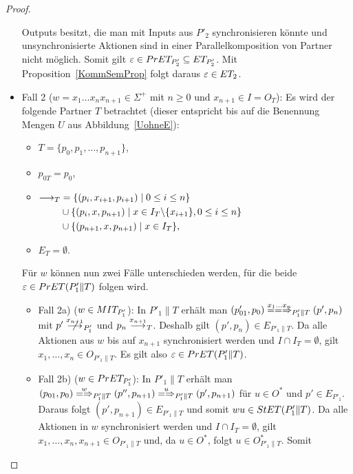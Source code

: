 \begin{proof}
\begin{itemize}
      Outputs besitzt, die man mit Inputs aus $P'_2$ synchronisieren könnte und
      unsynchronisierte Aktionen sind in einer Parallelkomposition von Partner
      nicht möglich. Somit gilt $\varepsilon\in PrET _{P'_2}\subseteq ET
      _{P'_2}$. Mit Proposition~\ref{KommSemProp} folgt daraus $\varepsilon\in
      ET _2$.
    \item Fall 2 ($w=x_1\dots x_n x_{n+1}\in\Sigma ^+$ mit $n\geq 0$ und
      $x_{n+1}\in I=O_T$): Es wird der folgende Partner $T$ betrachtet (dieser
      entspricht bis auf die Benennung Mengen $U$ aus Abbildung~\ref{UohneE}):
      \begin{itemize}
        \item $T=\{p_0,p_1,\dots ,p_{n+1}\}$,
        \item $p_{0T}=p_0$,
        \item $\begin{aligned}[t]
            \must _T&=\{(p_i,x_{i+1},p_{i+1})\mid  0\leq i\leq n\}\\
            &\cup\{(p_i,x,p_{n+1})\mid  x\in I_T\backslash\{x_{i+1}\}, 0\leq
            i\leq n\}\\
            &\cup\{(p_{n+1},x,p_{n+1})\mid  x\in I_T\},
        \end{aligned}$
        \item $E_T=\emptyset$.
      \end{itemize}
      Für $w$ können nun zwei Fälle unterschieden werden, für die beide
      $\varepsilon\in PrET (P'_1\|T)$ folgen wird.
      \begin{itemize}
        \item Fall 2a) ($w\in MIT _{P'_1}$): In $P'_1\|T$ erhält man
          $(p'_{01},p_0) \lweakmay[x_1\dots x_n]_{P'_1\|T} (p',p_n)$ mit $p'
          \nmust[x_{n+1}]_{P'_1}$ und $p_n\must[x_{n+1}]_T$. Deshalb gilt
          $(p',p_n)\in E_{P'_1\|T}$. Da alle Aktionen aus $w$ bis auf $x_{n+1}$
          synchronisiert werden und $I\cap I_T=\emptyset$, gilt $x_1,\dots ,
          x_n\in O_{P'_1\|T}$. Es gilt also $\varepsilon\in PrET (P'_1\|T)$.
        \item Fall 2b) ($w\in PrET _{P'_1}$): In $P'_1\|T$ erhält man
          $(p_{01},p_0) \weakmay[w]_{P'_1\|T} (p'',p_{n+1})
          \weakmay[u]_{P'_1\|T} (p',p_{n+1})$ für $u\in O^*$ und $p'\in
          E_{P'_1}$. Daraus folgt $(p',p_{n+1})\in E_{P'_1\|T}$ und somit
          $wu\in StET (P'_1\|T)$. Da alle Aktionen in $w$ synchronisiert werden
          und $I\cap I_T = \emptyset$, gilt $x_1,\dots , x_n, x_{n+1}\in
          O_{P'_1\|T}$ und, da $u\in O^*$, folgt $u\in O^*_{P'_1\|T}$. Somit

\end{itemize}
\end{itemize}
\end{proof}
